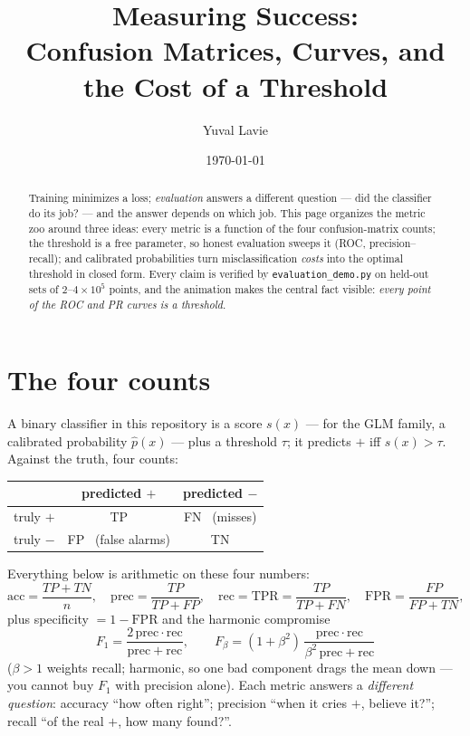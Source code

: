 \documentclass[11pt]{article}
\title{Measuring Success:\\
Confusion Matrices, Curves, and the Cost of a Threshold}
\author{Yuval Lavie}
\date{\today}
\begin{document}
\maketitle

\begin{abstract}
Training minimizes a loss; \emph{evaluation} answers a different
question --- did the classifier do its job? --- and the answer depends
on which job. This page organizes the metric zoo around three ideas:
every metric is a function of the four confusion-matrix counts; the
threshold is a free parameter, so honest evaluation sweeps it (ROC,
precision--recall); and calibrated probabilities turn misclassification
\emph{costs} into the optimal threshold in closed form. Every claim is
verified by \texttt{evaluation\_demo.py} on held-out sets of $2$--$4
\times 10^5$ points, and the animation makes the central fact visible:
\emph{every point of the ROC and PR curves is a threshold}.
\end{abstract}

\section{The four counts}

A binary classifier in this repository is a score $s(x)$ --- for the
GLM family, a calibrated probability $\hat p(x)$ --- plus a threshold
$\tau$; it predicts $+$ iff $s(x) > \tau$. Against the truth, four
counts:
\begin{center}
\begin{tabular}{lcc}
\toprule
 & predicted $+$ & predicted $-$\\
\midrule
truly $+$ & TP & FN \ (misses)\\
truly $-$ & FP \ (false alarms) & TN\\
\bottomrule
\end{tabular}
\end{center}
Everything below is arithmetic on these four numbers:
\begin{equation}
  \mathrm{acc} = \frac{TP+TN}{n}, \quad
  \mathrm{prec} = \frac{TP}{TP+FP}, \quad
  \mathrm{rec} = \mathrm{TPR} = \frac{TP}{TP+FN}, \quad
  \mathrm{FPR} = \frac{FP}{FP+TN},
  \label{eq:defs}
\end{equation}
plus specificity $= 1 - \mathrm{FPR}$ and the harmonic compromise
\begin{equation}
  F_1 = \frac{2\,\mathrm{prec}\cdot\mathrm{rec}}
             {\mathrm{prec}+\mathrm{rec}},
  \qquad
  F_\beta = (1+\beta^2)\,
  \frac{\mathrm{prec}\cdot\mathrm{rec}}
       {\beta^2\,\mathrm{prec}+\mathrm{rec}}
  \label{eq:f1}
\end{equation}
($\beta > 1$ weights recall; harmonic, so one bad component drags the
mean down --- you cannot buy $F_1$ with precision alone). Each metric
answers a \emph{different question}: accuracy ``how often right'';
precision ``when it cries $+$, believe it?''; recall ``of the real
$+$, how many found?''.
\end{document}
